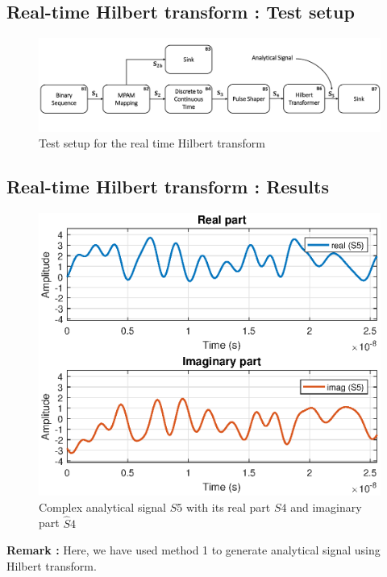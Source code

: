 \subsection*{Real-time Hilbert transform : Test setup}
\begin{figure}[h]
	\centering
	\includegraphics[width=14cm]{./algorithms/hilbert/figures/test_setup.pdf}
	\caption{Test setup for the real time Hilbert transform }\label{test_setup}
\end{figure}
\subsection*{Real-time Hilbert transform : Results}
\begin{figure}[h]
	\centering
	\includegraphics[width=13cm]{./algorithms/hilbert/figures/S5.eps}
	\caption{Complex analytical signal $S5$ with its real part $S4$ and imaginary part $\hat{S}4$}\label{S5}
\end{figure}
\textbf{Remark :} Here, we have used method 1 to generate analytical signal using Hilbert transform.


